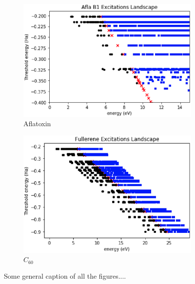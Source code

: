 \documentclass[11pt,a4paper]{article}
\begin{document}
\begin{figure}[h]
    \centering
    \begin{subfigure}[t]{0.48\textwidth}
        \centering
        \includegraphics[width=\linewidth]{Aflatoxin_ExcitationLandscape.eps} 
        \caption{Aflatoxin} \label{fig:a}
    \end{subfigure}
    \hfill
    \begin{subfigure}[t]{0.48\textwidth}
        \centering
        \includegraphics[width=\linewidth]{C60_ExcitationLandscape.eps} 
        \caption{$C_{60}$} \label{fig:b}
    \end{subfigure}

    \caption{Some general caption of all the figures....}
\end{figure}

\end{document}
